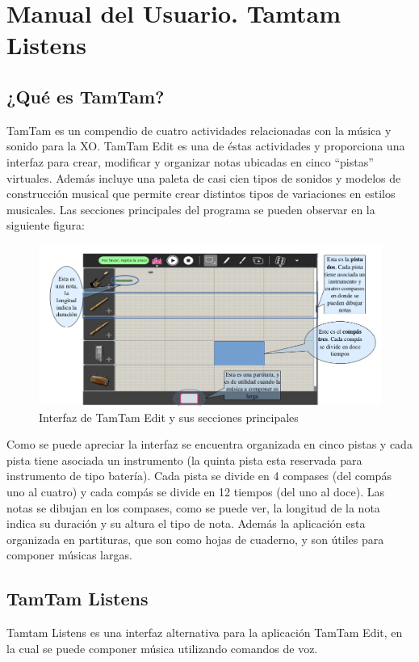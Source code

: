 \section{Manual del Usuario. Tamtam Listens}

\subsection{¿Qu\'e es TamTam?}

TamTam es un compendio de cuatro actividades relacionadas con la m\'usica y sonido para la XO.
TamTam Edit es una de \'estas actividades y proporciona una interfaz para crear, modificar y organizar
notas ubicadas en cinco ``pistas'' virtuales. Adem\'as incluye una paleta de casi cien tipos de sonidos y
modelos de construcci\'on musical que permite crear distintos tipos de variaciones en estilos musicales.
Las secciones principales del programa se pueden observar en la siguiente figura:


\begin{figure}[H] 
\centering
\includegraphics[width=1\textwidth]{./graphics/ui-tamtam.png}
\caption{Interfaz de TamTam Edit y sus secciones principales}
\label{figure:ui-tamtam}
\end{figure}

Como se puede apreciar la interfaz se encuentra organizada en cinco pistas y cada pista tiene asociada
un instrumento (la quinta pista esta reservada para instrumento de tipo bater\'ia). Cada pista se divide en
4 compases (del comp\'as uno al cuatro) y cada comp\'as se divide en 12 tiempos (del uno al doce). Las
notas se dibujan en los compases, como se puede ver, la longitud de la nota indica su duraci\'on y su
altura el tipo de nota.  Adem\'as la aplicaci\'on esta organizada en partituras, que son como hojas  de
cuaderno, y son \'utiles para componer m\'usicas largas.

\subsection{TamTam Listens}
Tamtam Listens es una interfaz alternativa para la aplicaci\'on TamTam Edit, en la cual se puede
componer m\'usica utilizando comandos de voz. 

